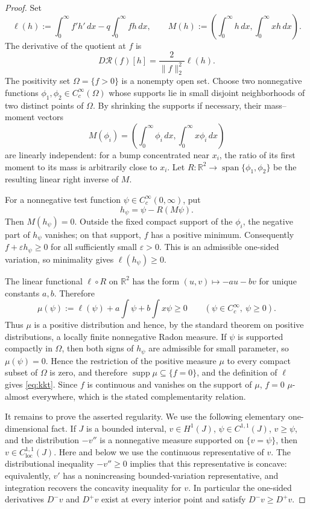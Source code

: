 \documentclass[11pt]{amsart}
\theoremstyle{definition}
\theoremstyle{remark}
\newcommand{\Rcal}{\mathcal R}
\begin{document}
\begin{proof}
Set
\[
 \ell(h):=\int_0^\infty f'h'\,dx-q\int_0^\infty fh\,dx,
 \qquad
 M(h):=\left(\int_0^\infty h\,dx,
                 \int_0^\infty xh\,dx\right).
\]
The derivative of the quotient at $f$ is
\[
 D\Rcal(f)[h]=\frac{2}{\|f\|_2^2}\ell(h).
\]
The positivity set $\Omega=\{f>0\}$ is a nonempty open set. Choose two
nonnegative functions $\phi_1,\phi_2\in C_c^\infty(\Omega)$ whose supports lie
in small disjoint neighborhoods of two distinct points of $\Omega$. By
shrinking the supports if necessary, their mass--moment vectors
\[
 M(\phi_i)=\left(\int_0^\infty\phi_i\,dx,
                       \int_0^\infty x\phi_i\,dx\right)
\]
are linearly independent: for a bump concentrated near $x_i$, the ratio of
its first moment to its mass is arbitrarily close to $x_i$. Let
$R:\mathbb R^2\to\operatorname{span}\{\phi_1,\phi_2\}$ be the resulting
linear right inverse of $M$.

For a nonnegative test function $\psi\in C_c^\infty(0,\infty)$, put
\[
 h_\psi=\psi-R(M\psi).
\]
Then $M(h_\psi)=0$. Outside the fixed compact support of the $\phi_i$, the
negative part of $h_\psi$ vanishes; on that support, $f$ has a positive
minimum. Consequently $f+\varepsilon h_\psi\geq0$ for all sufficiently small
$\varepsilon>0$. This is an admissible one-sided variation, so minimality gives
$\ell(h_\psi)\geq0$.

The linear functional $\ell\circ R$ on $\mathbb R^2$ has the form
$(u,v)\mapsto-au-bv$ for unique constants $a,b$. Therefore
\[
 \mu(\psi):=\ell(\psi)+a\int\psi+b\int x\psi\geq0
 \qquad(\psi\in C_c^\infty,\ \psi\geq0).
\]
Thus $\mu$ is a positive distribution and hence, by the standard theorem on
positive distributions, a locally finite
nonnegative Radon measure. If $\psi$ is supported compactly in $\Omega$, then
both signs of $h_\psi$ are admissible for small parameter, so
$\mu(\psi)=0$. Hence the restriction of the positive measure $\mu$ to every
compact subset of $\Omega$ is zero, and therefore
$\operatorname{supp}\mu\subseteq\{f=0\}$, and the definition of $\ell$ gives
\eqref{eq:kkt}. Since $f$ is continuous and vanishes on the support of $\mu$,
$f=0$ $\mu$-almost everywhere, which is the stated complementarity relation.

It remains to prove the asserted regularity. We use the following elementary
one-dimensional fact. If $J$ is a bounded interval, $v\in H^1(J)$,
$\psi\in C^{1,1}(J)$, $v\geq\psi$, and the distribution $-v''$ is a
nonnegative measure supported on $\{v=\psi\}$, then
$v\in C^{1,1}_{\mathrm{loc}}(J)$. Here and below we use the continuous
representative of $v$. The distributional inequality $-v''\geq0$ implies that
this representative is concave: equivalently, $v'$ has a nonincreasing
bounded-variation representative, and integration recovers the concavity
inequality for $v$. In particular the one-sided derivatives $D^-v$ and
$D^+v$ exist at every interior point and satisfy $D^-v\geq D^+v$.


\end{proof}
\end{document}
